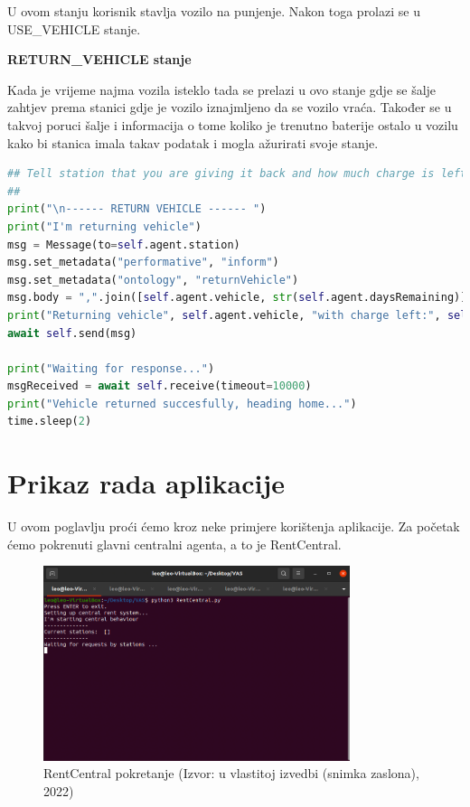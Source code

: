\documentclass{foi}
\begin{document}
U ovom stanju korisnik stavlja vozilo na punjenje. Nakon toga prolazi se u USE\_VEHICLE stanje.

\begin{flushleft}\textbf{RETURN\_VEHICLE stanje}\end{flushleft}

Kada je vrijeme najma vozila isteklo tada se prelazi u ovo stanje gdje se šalje zahtjev prema stanici gdje je vozilo iznajmljeno da se vozilo vraća. Također se u takvoj poruci šalje i informacija o tome koliko je trenutno baterije ostalo u vozilu kako bi stanica imala takav podatak i mogla ažurirati svoje stanje.

\begin{lstlisting}[language=Python]
 ## Tell station that you are giving it back and how much charge is left
##
print("\n------ RETURN VEHICLE ------ ")
print("I'm returning vehicle")
msg = Message(to=self.agent.station)
msg.set_metadata("performative", "inform")
msg.set_metadata("ontology", "returnVehicle")
msg.body = ",".join([self.agent.vehicle, str(self.agent.daysRemaining)])
print("Returning vehicle", self.agent.vehicle, "with charge left:", self.agent.daysRemaining)
await self.send(msg)

print("Waiting for response...")
msgReceived = await self.receive(timeout=10000)
print("Vehicle returned succesfully, heading home...")
time.sleep(2)
\end{lstlisting}

\chapter{Prikaz rada aplikacije}

U ovom poglavlju proći ćemo kroz neke primjere korištenja aplikacije. Za početak ćemo pokrenuti glavni centralni agenta, a to je RentCentral.

\begin{figure}[H]
    \centering
    \includegraphics[width=0.8\textwidth]{slike/vas1}
    \caption{RentCentral pokretanje (Izvor: u vlastitoj izvedbi (snimka zaslona), 2022)}
\end{figure}
\end{document}
